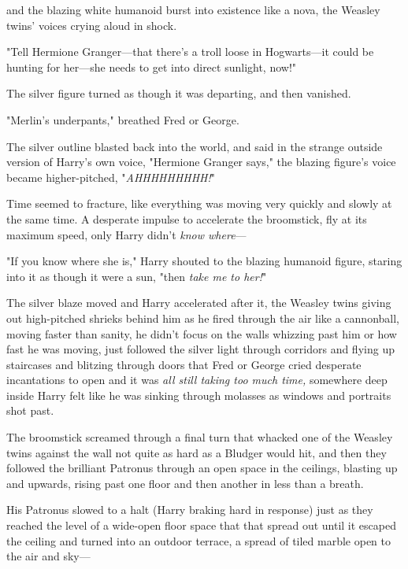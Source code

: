 and the blazing white humanoid burst into existence like a nova, the Weasley 
twins' voices crying aloud in shock.

"Tell Hermione Granger---that there's a troll loose in Hogwarts---it could be 
hunting for her---she needs to get into direct sunlight, now!"

The silver figure turned as though it was departing, and then vanished.

"Merlin's underpants," breathed Fred or George.

The silver outline blasted back into the world, and said in the strange outside 
version of Harry's own voice, "Hermione Granger says," the blazing figure's 
voice became higher-pitched, "\emph{AHHHHHHHHH!}"

Time seemed to fracture, like everything was moving very quickly and slowly at 
the same time. A desperate impulse to accelerate the broomstick, fly at its 
maximum speed, only Harry didn't \emph{know where}---

"If you know where she is," Harry shouted to the blazing humanoid figure, 
staring into it as though it were a sun, "then \emph{take me to her!}"

The silver blaze moved and Harry accelerated after it, the Weasley twins giving 
out high-pitched shrieks behind him as he fired through the air like a 
cannonball, moving faster than sanity, he didn't focus on the walls whizzing 
past him or how fast he was moving, just followed the silver light through 
corridors and flying up staircases and blitzing through doors that Fred or 
George cried desperate incantations to open and it was \emph{all still taking 
too much time,} somewhere deep inside Harry felt like he was sinking through 
molasses as windows and portraits shot past.

The broomstick screamed through a final turn that whacked one of the Weasley 
twins against the wall not quite as hard as a Bludger would hit, and then they 
followed the brilliant Patronus through an open space in the ceilings, blasting 
up and upwards, rising past one floor and then another in less than a breath.

His Patronus slowed to a halt (Harry braking hard in response) just as they 
reached the level of a wide-open floor space that that spread out until it 
escaped the ceiling and turned into an outdoor terrace, a spread of tiled 
marble open to the air and sky---
